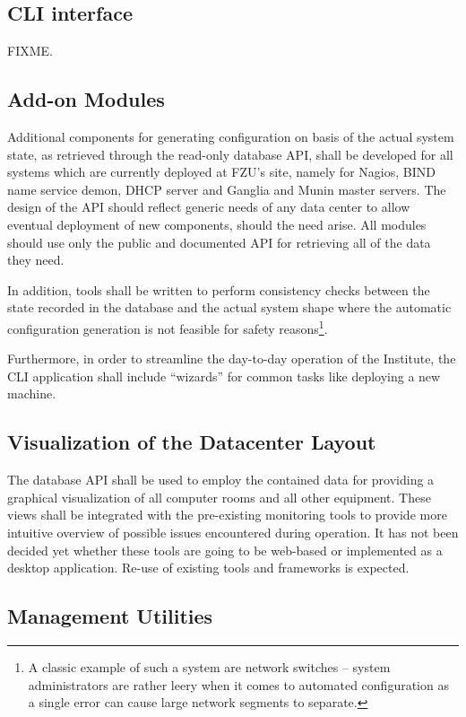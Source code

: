 \documentclass{article}
\begin{document}
\subsection{CLI interface}

FIXME.

\subsection{Add-on Modules}

Additional components for generating configuration on basis of the actual system state, as retrieved through the read-only
database API, shall be developed for all systems which are currently deployed at FZU's site, namely for Nagios, BIND name service
demon, DHCP server and Ganglia and Munin master servers.  The design of the API should reflect generic needs of any data center to
allow eventual deployment of new components, should the need arise.  All modules should use only the public and documented API for
retrieving all of the data they need.

In addition, tools shall be written to perform consistency checks between the state recorded in the database and the actual system
shape where the automatic configuration generation is not feasible for safety reasons\footnote{A classic example of such a system
are network switches -- system administrators are rather leery when it comes to automated configuration as a single error can
cause large network segments to separate.}.

Furthermore, in order to streamline the day-to-day operation of the Institute, the CLI application shall include ``wizards'' for
common tasks like deploying a new machine.

\subsection{Visualization of the Datacenter Layout}

The database API shall be used to employ the contained data for providing a graphical visualization of all computer rooms and all
other equipment.  These views shall be integrated with the pre-existing monitoring tools to provide more intuitive overview of
possible issues encountered during operation.  It has not been decided yet whether these tools are going to be web-based or
implemented as a desktop application.  Re-use of existing tools and frameworks is expected.

\subsection{Management Utilities}
\end{document}
